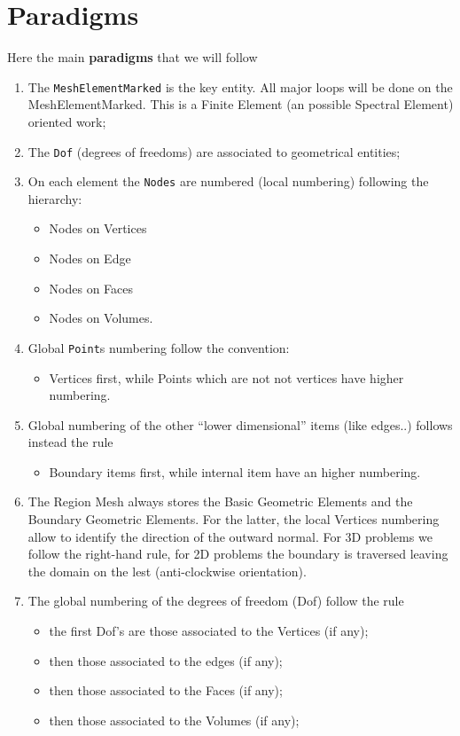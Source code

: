 \section{Paradigms}
\label{sec:paradigms}
Here the  main \textbf{paradigms} that we will follow
\begin{enumerate}
\item The \texttt{MeshElementMarked} is the key entity. All major loops will
  be done on the MeshElementMarked. This is a Finite Element (an possible
  Spectral Element) oriented work;
\item The \texttt{Dof} (degrees of freedoms) are associated to
  geometrical entities;
\item On each element the \texttt{Nodes} are numbered (local
  numbering) following the hierarchy:
\begin{itemize}
\item Nodes on Vertices
\item Nodes on Edge
\item Nodes on Faces
\item Nodes on Volumes.
\end{itemize}
\item Global \texttt{Point}s numbering follow the convention:
\begin{itemize}
\item Vertices first, while Points which are not not vertices have higher numbering.
\end{itemize}
\item Global numbering of the other ``lower dimensional'' items (like
  edges..)  follows instead the rule
\begin{itemize}
\item Boundary items first, while internal item have an higher numbering.
\end{itemize}
\item The Region Mesh always stores the Basic Geometric Elements and
  the Boundary Geometric Elements. For the latter, the local Vertices
  numbering allow to identify the direction of the outward normal. For
  3D problems we follow the right-hand rule, for 2D problems the
  boundary is traversed leaving the domain on the lest (anti-clockwise
  orientation).
\item The global numbering of the degrees of freedom (Dof) follow the
  rule
\begin{itemize}
\item  the first Dof's are those associated to the Vertices (if any);
\item then those associated to the edges (if any);
\item then those associated to the Faces (if any);
\item then those associated to the Volumes (if any);
\end{itemize}
\end{enumerate}

